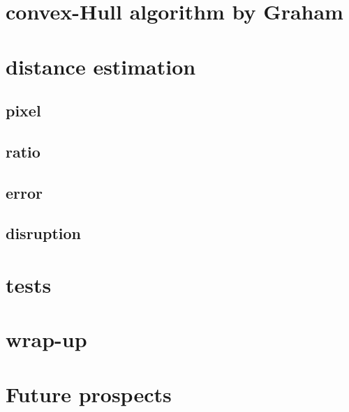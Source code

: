\documentclass[10pt,a4paper]{article}
\begin{document}
	\section{convex-Hull algorithm by Graham} \label{convex-hull}
	
	\section{distance estimation}
	
	\subsection{pixel}
	
	\subsection{ratio}
	
	\subsection{error}
	
	\subsection{disruption}
	
	\section{tests}
	
	\section{wrap-up}
	
	\section{Future prospects}
	
\end{document}
